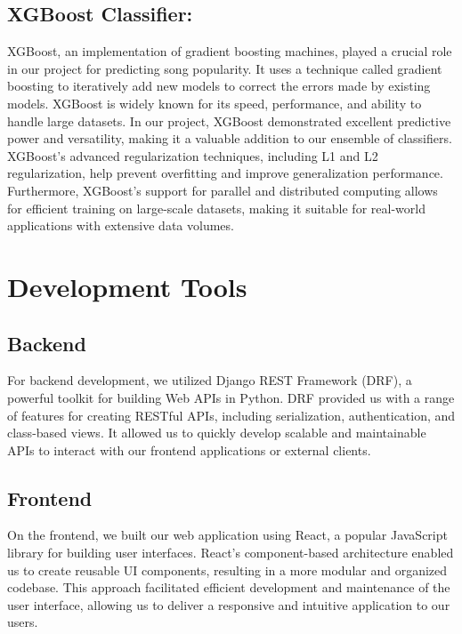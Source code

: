 \documentclass[11pt]{report}
\begin{document}
\subsection{XGBoost Classifier:}
   XGBoost, an implementation of gradient boosting machines, played a crucial role in our project for predicting song popularity. It uses a technique called gradient boosting to iteratively add new models to correct the errors made by existing models. XGBoost is widely known for its speed, performance, and ability to handle large datasets. In our project, XGBoost demonstrated excellent predictive power and versatility, making it a valuable addition to our ensemble of classifiers. XGBoost's advanced regularization techniques, including L1 and L2 regularization, help prevent overfitting and improve generalization performance. Furthermore, XGBoost's support for parallel and distributed computing allows for efficient training on large-scale datasets, making it suitable for real-world applications with extensive data volumes.

\section{Development Tools}

\subsection*{Backend}
For backend development, we utilized Django REST Framework (DRF), a powerful toolkit for building Web APIs in Python. DRF provided us with a range of features for creating RESTful APIs, including serialization, authentication, and class-based views. It allowed us to quickly develop scalable and maintainable APIs to interact with our frontend applications or external clients.
\subsection*{Frontend}
On the frontend, we built our web application using React, a popular JavaScript library for building user interfaces. React's component-based architecture enabled us to create reusable UI components, resulting in a more modular and organized codebase. This approach facilitated efficient development and maintenance of the user interface, allowing us to deliver a responsive and intuitive application to our users.
\end{document}
